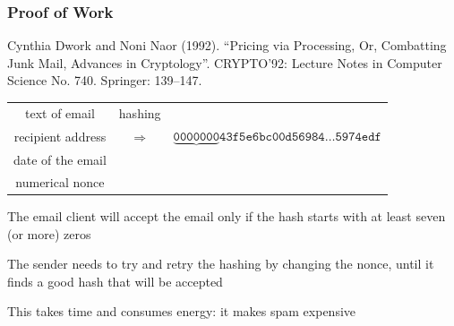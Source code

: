 \documentclass[11pt]{beamer}  %
\begin{document}
\begin{frame}\frametitle{Proof of Work}

  \begin{redbox}{}
    Cynthia Dwork and Noni Naor (1992). “Pricing via Processing, Or, Combatting Junk Mail, Advances in Cryptology”. CRYPTO’92: Lecture Notes in Computer Science No. 740. Springer: 139–147.
  \end{redbox}

  \bigskip

  \begin{tabular}{ccc}
    text of email & hashing & \\
    recipient address & $\Rightarrow$ & $\mathtt{\underbrace{0000000}43f5e6bc00d56984\ldots5974edf}$\\
    date of the email && \\
    numerical nonce &&
  \end{tabular}

  \bigskip

  The email client will accept the email only if the hash starts with at least seven (or more) zeros

  \bigskip

  The sender needs to try and retry the hashing by changing the nonce, until it finds a good hash that will be accepted

  \bigskip

  This takes time and consumes energy: it makes spam expensive

\end{frame}
\end{document}
